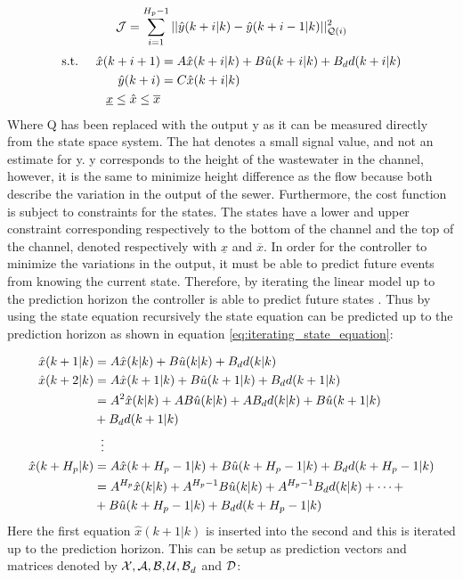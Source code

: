 \begin{equation}\label{eq:cost_function_height}
	 \CMcal{J} = \sum_{i=1}^{H_p-1} || \hat{y}(k+i|k)-\hat{y}(k+i-1|k)||_{\CMcal{Q}(i)}^2
\end{equation}
\begin{equation}
	\begin{aligned}
	\text{s.t.} \hspace{5mm}  \hat{x}(k+i+1) &= A\hat{x}(k+i|k)+B\hat{u}(k+i|k)+B_dd(k+i|k) \\
						      \hat{y}(k+i)&= C\hat{x}(k+i|k) \\
						     \underline{x} \leq \hat{x} \leq \overline{x}
	\end{aligned}
\end{equation}
Where Q has been replaced with the output y as it can be measured directly from the state space system. The hat denotes a small signal value, and not an estimate for y. y corresponds to the height of the wastewater in the channel, however, it is the same to minimize height difference as the flow because both describe the variation in the output of the sewer. Furthermore, the cost function is subject to constraints for the states. The states have a lower and upper constraint corresponding respectively to the bottom of the channel and the top of the channel, denoted respectively with $\underline{x}$ and $\overline{x}$. In order for the controller to minimize the variations in the output, it must be able to predict future events from knowing the current state. Therefore, by iterating the linear model up to the prediction horizon the controller is able to predict future states \cite{maciejowski2002predictive}. Thus by using the state equation recursively the state equation can be predicted up to the prediction horizon as shown in equation \ref{eq:iterating_state_equation}: 

\begin{equation}\label{eq:iterating_state_equation}
\begin{aligned}
	\hat{x}(k+1|k) &= A\hat{x}(k|k)+B\hat{u}(k|k) + B_dd(k|k)\\
	\hat{x}(k+2|k) &= A\hat{x}(k+1|k)+B\hat{u}(k+1|k)+ B_dd(k+1|k) \\
				   &= A^2\hat{x}(k|k)+AB\hat{u}(k|k)+AB_dd(k|k) + B\hat{u}(k+1|k) \\
				   &+ B_dd(k+1|k) \\
				   &\hspace{2mm}\vdots\\
   \hat{x}(k+H_p|k)&= A\hat{x}(k+H_p-1|k)+B\hat{u}(k+H_p-1|k)+B_dd(k+H_p-1|k)\\
   				   &= A^{H_p}\hat{x}(k|k)+A^{H_p-1}B\hat{u}(k|k)+A^{H_p-1}B_dd(k|k)+\cdots+\\
   				   &+B\hat{u}(k+H_p-1|k)+B_dd(k+H_p-1|k)
\end{aligned}
\end{equation}
Here the first equation $\hat{x}(k+1|k)$ is inserted into the second and this is iterated up to the prediction horizon. This can be setup as prediction vectors and matrices denoted by $\CMcal{X,A,B,U,B}_d$ and $\CMcal{D}$:


